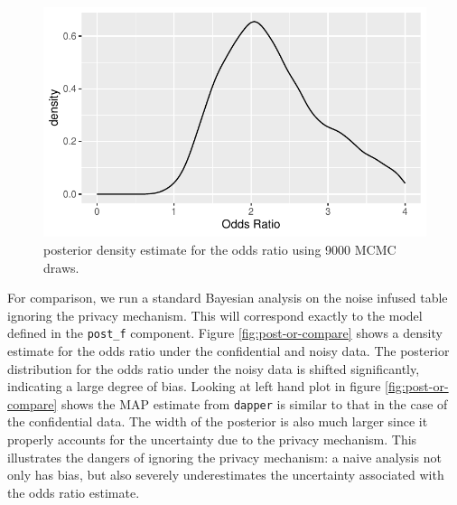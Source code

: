\begin{figure}

{\centering \includegraphics{dppaper_files/figure-latex/post-or-density-1} 

}

\caption{posterior density estimate for the odds ratio using 9000 MCMC draws.}\label{fig:post-or-density}
\end{figure}

For comparison, we run a standard Bayesian analysis on the
noise infused table ignoring the privacy mechanism. This will
correspond exactly to the model defined in the \texttt{post\_f} component.
Figure \ref{fig:post-or-compare} shows a density estimate for the odds ratio
under the confidential and noisy data. The posterior
distribution for the odds ratio under the noisy data
is shifted significantly, indicating a large degree of bias.
Looking at left hand plot in figure \ref{fig:post-or-compare} shows the MAP estimate from \texttt{dapper}
is similar to that in the case of the confidential data.
The width of the posterior is also much larger since
it properly accounts for the uncertainty due to the privacy mechanism. This
illustrates the dangers of ignoring the privacy mechanism: a naive
analysis not only has bias, but also severely underestimates the
uncertainty associated with the odds ratio estimate.

